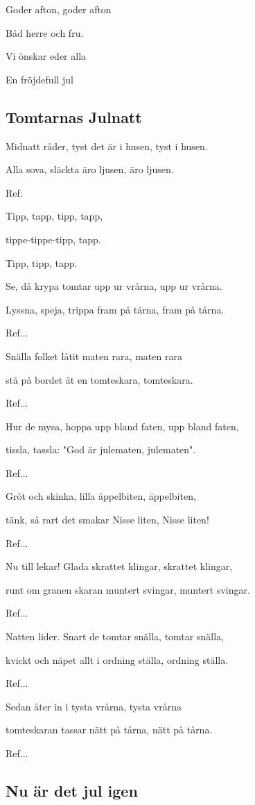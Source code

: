 Goder afton, goder afton

Båd herre och fru.

Vi önskar eder alla

En fröjdefull jul 

\subsection{\textbf{Tomtarnas Julnatt}}

Midnatt råder, tyst det är i husen, tyst i husen.

Alla sova, släckta äro ljusen, äro ljusen. \bigskip

Ref:

Tipp, tapp, tipp, tapp,

tippe-tippe-tipp, tapp.

Tipp, tipp, tapp. \bigskip

Se, då krypa tomtar upp ur vrårna, upp ur vrårna.

Lyssna, speja, trippa fram på tårna, fram på tårna.

Ref... \bigskip

Snälla folket låtit maten rara, maten rara

stå på bordet åt en tomteskara, tomteskara.

Ref... \bigskip

Hur de mysa, hoppa upp bland faten, upp bland faten,

tissla, tassla: "God är julematen, julematen".

Ref... \bigskip

Gröt och skinka, lilla äppelbiten, äppelbiten,

tänk, så rart det smakar Nisse liten, Nisse liten!

Ref... \bigskip

Nu till lekar! Glada skrattet klingar, skrattet klingar,

runt om granen skaran muntert svingar, muntert svingar.

Ref...\bigskip

Natten lider. Snart de tomtar snälla, tomtar snälla,

kvickt och näpet allt i ordning ställa, ordning ställa.

Ref... \bigskip

Sedan åter in i tysta vrårna, tysta vrårna

tomteskaran tassar nätt på tårna, nätt på tårna.

Ref... \bigskip

\subsection{\textbf{Nu är det jul igen}}

